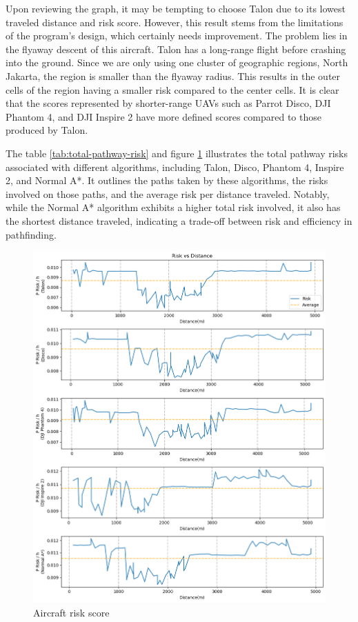\documentclass[12pt]{report}
\begin{document}
        Upon reviewing the graph, it may be tempting to choose Talon due to its lowest traveled distance and risk score.
        However, this result stems from the limitations of the program's design, which certainly needs improvement. The
        problem lies in the flyaway descent of this aircraft. Talon has a long-range flight before crashing into the
        ground. Since we are only using one cluster of geographic regions, North Jakarta, the region is smaller than the
        flyaway radius. This results in the outer cells of the region having a smaller risk compared to the center
        cells. It is clear that the scores represented by shorter-range UAVs such as Parrot Disco, DJI Phantom 4, and
        DJI Inspire 2 have more defined scores compared to those produced by Talon.


        The table \ref{tab:total-pathway-risk} and figure \ref{fig:total-path1} illustrates the total pathway risks
        associated with different algorithms, including Talon, Disco, Phantom 4, Inspire 2, and Normal A*. It outlines
        the paths taken by these algorithms, the risks involved on those paths, and the average risk per distance
        traveled. Notably, while the Normal A* algorithm exhibits a higher total risk involved, it also has the shortest
        distance traveled, indicating a trade-off between risk and efficiency in pathfinding.

        \begin{figure}[H]
            \centering
            \includegraphics[width=\textwidth]{Plot/risk_vs_distance.png}
            \caption{Aircraft risk score}
            \label{fig:total-path1}
        \end{figure}
\end{document}
